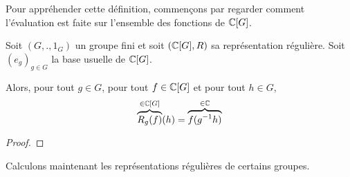 Pour appréhender cette définition, commençons par regarder comment l'évaluation
est faite sur l'ensemble des fonctions de $\mathbb{C}[G]$.

\begin{proposition}
	Soit $(G, ., 1_{G})$ un groupe fini et soit $(\mathbb{C}[G],
	R)$ sa représentation régulière. Soit $(e_{g})_{g \in G}$
	la base usuelle de $\mathbb{C}[G]$.

	Alors, pour tout $g \in G$, pour tout $f \in \mathbb{C}[G]$ et pour tout $h
	\in G$,
	\begin{equation}
		\overbrace{R_{g}(f)}^{\in \mathbb{C}[G]}(h) = \overbrace{f(g^{-1}h)}^{\in
		\mathbb{C}}
	\end{equation}
\end{proposition}

\ifdefined\outputproof
\begin{proof}

\end{proof}
\fi

Calculons maintenant les représentations régulières de certains groupes.

